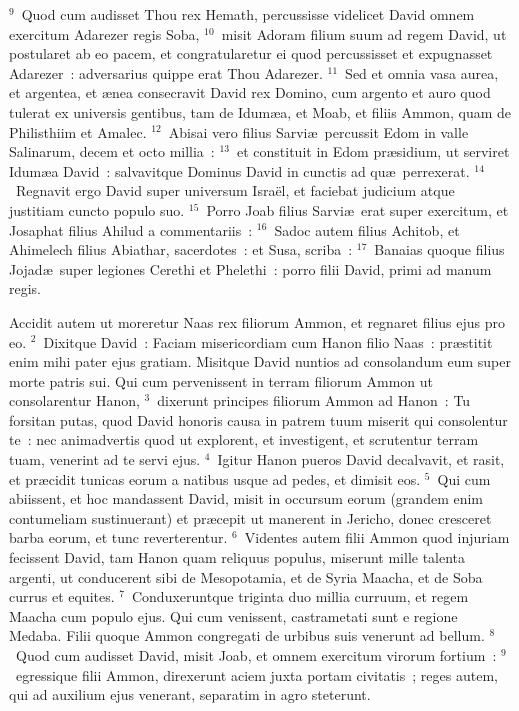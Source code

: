 ${}^{9}$~Quod cum audisset Thou rex Hemath, percussisse videlicet David omnem exercitum Adarezer regis Soba,
${}^{10}$~misit Adoram filium suum ad regem David, ut postularet ab eo pacem, et congratularetur ei quod percussisset et expugnasset Adarezer~: adversarius quippe erat Thou Adarezer.
${}^{11}$~Sed et omnia vasa aurea, et argentea, et \ae nea consecravit David rex Domino, cum argento et auro quod tulerat ex universis gentibus, tam de Idum\ae a, et Moab, et filiis Ammon, quam de Philisthiim et Amalec.
${}^{12}$~Abisai vero filius Sarvi\ae\ percussit Edom in valle Salinarum, decem et octo millia~:
${}^{13}$~et constituit in Edom pr\ae sidium, ut serviret Idum\ae a David~: salvavitque Dominus David in cunctis ad qu\ae\ perrexerat.
${}^{14}$~Regnavit ergo David super universum Isra\"el, et faciebat judicium atque justitiam cuncto populo suo.
${}^{15}$~Porro Joab filius Sarvi\ae\ erat super exercitum, et Josaphat filius Ahilud a commentariis~:
${}^{16}$~Sadoc autem filius Achitob, et Ahimelech filius Abiathar, sacerdotes~: et Susa, scriba~:
${}^{17}$~Banaias quoque filius Jojad\ae\ super legiones Cerethi et Phelethi~: porro filii David, primi ad manum regis.

\bchapter
\lettrine[lines=3,image=true,loversize=0.05,lraise=-0.03]{A}{}ccidit autem ut moreretur Naas rex filiorum Ammon, et regnaret filius ejus pro eo.
${}^{2}$~Dixitque David~: Faciam misericordiam cum Hanon filio Naas~: pr\ae stitit enim mihi pater ejus gratiam. Misitque David nuntios ad consolandum eum super morte patris sui. Qui cum pervenissent in terram filiorum Ammon ut consolarentur Hanon,
${}^{3}$~dixerunt principes filiorum Ammon ad Hanon~: Tu forsitan putas, quod David honoris causa in patrem tuum miserit qui consolentur te~: nec animadvertis quod ut explorent, et investigent, et scrutentur terram tuam, venerint ad te servi ejus.
${}^{4}$~Igitur Hanon pueros David decalvavit, et rasit, et pr\ae cidit tunicas eorum a natibus usque ad pedes, et dimisit eos.
${}^{5}$~Qui cum abiissent, et hoc mandassent David, misit in occursum eorum (grandem enim contumeliam sustinuerant) et pr\ae cepit ut manerent in Jericho, donec cresceret barba eorum, et tunc reverterentur.
${}^{6}$~Videntes autem filii Ammon quod injuriam fecissent David, tam Hanon quam reliquus populus, miserunt mille talenta argenti, ut conducerent sibi de Mesopotamia, et de Syria Maacha, et de Soba currus et equites.
${}^{7}$~Conduxeruntque triginta duo millia curruum, et regem Maacha cum populo ejus. Qui cum venissent, castrametati sunt e regione Medaba. Filii quoque Ammon congregati de urbibus suis venerunt ad bellum.
${}^{8}$~Quod cum audisset David, misit Joab, et omnem exercitum virorum fortium~:
${}^{9}$~egressique filii Ammon, direxerunt aciem juxta portam civitatis~; reges autem, qui ad auxilium ejus venerant, separatim in agro steterunt.


